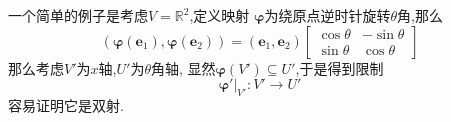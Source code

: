 \begin{brown}
\begin{example}
    一个简单的例子是考虑$V=\mathbb{R}^2$,定义映射
    $\bm{\varphi}$为绕原点逆时针旋转$\theta$角,那么
    \[
    \left(\bm{\varphi}\left(\bm{e}_1\right),\bm{\varphi}\left(\bm{e}
    _2\right)\right)=\left(\bm{e}_1,\bm{e}_2\right)\begin{bmatrix}
        \cos \theta & -\sin \theta\\
        \sin \theta & \cos\theta
    \end{bmatrix}
    \]
    那么考虑$V'$为$x$轴,$U'$为$\theta$角轴,
    显然$\bm{\varphi}\left(V'\right)\subseteq U'$,于是得到限制
    \[
    \bm{\varphi}'\Big |_{V'}:V'\longrightarrow U'
    \]
    容易证明它是双射.
\end{example}
\end{brown}

